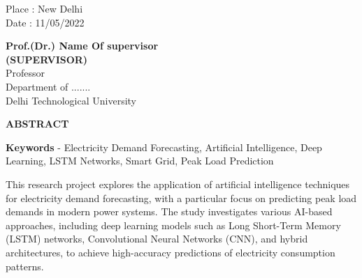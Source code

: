 \documentclass[12pt,a4paper]{report}
\begin{document}
\noindent \begin{minipage}{4cm}
\begin{flushleft}
\vspace{1 cm}
                         
Place : New Delhi \\
Date : 11/05/2022 \\

\end{flushleft} 
\end{minipage}
\hfill
\begin{minipage}{10cm}
\begin{flushright}                                      
\vspace{2cm}
                         

\vspace{.8cm}
\textbf{Prof.(Dr.) Name Of supervisor}\\
\textbf{(SUPERVISOR)}\\
Professor\\
Department of ....... \\
Delhi Technological University\\
\end{flushright} 
\end{minipage}

\newpage


\begin{center}
 \textbf{ABSTRACT}
\end{center}

\textbf{Keywords} - Electricity Demand Forecasting, Artificial Intelligence, Deep Learning, LSTM Networks, Smart Grid, Peak Load Prediction

\vspace{0.8cm}

This research project explores the application of artificial intelligence techniques for electricity demand forecasting, with a particular focus on predicting peak load demands in modern power systems. The study investigates various AI-based approaches, including deep learning models such as Long Short-Term Memory (LSTM) networks, Convolutional Neural Networks (CNN), and hybrid architectures, to achieve high-accuracy predictions of electricity consumption patterns.
\end{document}

